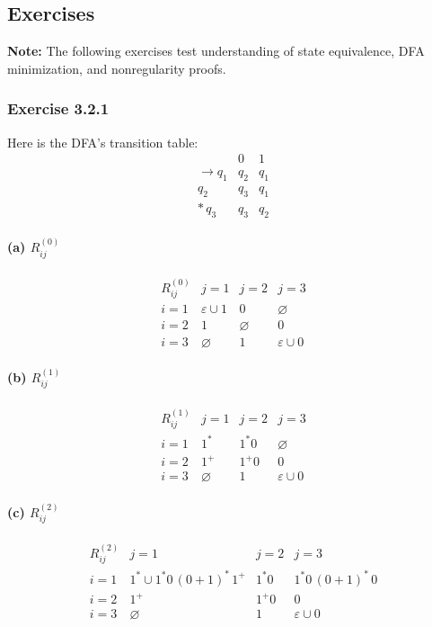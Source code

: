 \documentclass{article}
\theoremstyle{theorem}
\theoremstyle{definition}
\theoremstyle{remark}
\begin{document}
\subsection{Exercises}
\textbf{Note:} The following exercises test understanding of state equivalence, DFA minimization, and nonregularity proofs.

\subsubsection{Exercise 3.2.1}
Here is the DFA’s transition table:
\[
\begin{array}{c|cc}
     &0&1\\\hline
\to q_1 & q_2 & q_1\\
      q_2 & q_3 & q_1\\
*\,q_3 & q_3 & q_2
\end{array}
\]
\paragraph{(a) \(R_{ij}^{(0)}\)}
\[
\begin{array}{c|ccc}
R_{ij}^{(0)} & j=1 & j=2 & j=3\\\hline
i=1 & \varepsilon\cup1 & 0 & \varnothing\\
i=2 & 1 & \varnothing & 0\\
i=3 & \varnothing & 1 & \varepsilon\cup0
\end{array}
\]
\paragraph{(b) \(R_{ij}^{(1)}\)}
\[
\begin{array}{c|ccc}
R_{ij}^{(1)} & j=1 & j=2 & j=3\\\hline
i=1 & 1^* & 1^*0 & \varnothing\\
i=2 & 1^+ & 1^+0 & 0\\
i=3 & \varnothing & 1 & \varepsilon\cup0
\end{array}
\]
\paragraph{(c) \(R_{ij}^{(2)}\)}
\[
\begin{array}{c|ccc}
R_{ij}^{(2)} & j=1 & j=2 & j=3\\\hline
i=1 & 1^*\cup1^*0\,(0+1)^*\,1^+ 
      & 1^*0 
      & 1^*0\,(0+1)^*\,0\\
i=2 & 1^+ & 1^+0 & 0\\
i=3 & \varnothing & 1 & \varepsilon\cup0
\end{array}
\]
\end{document}
